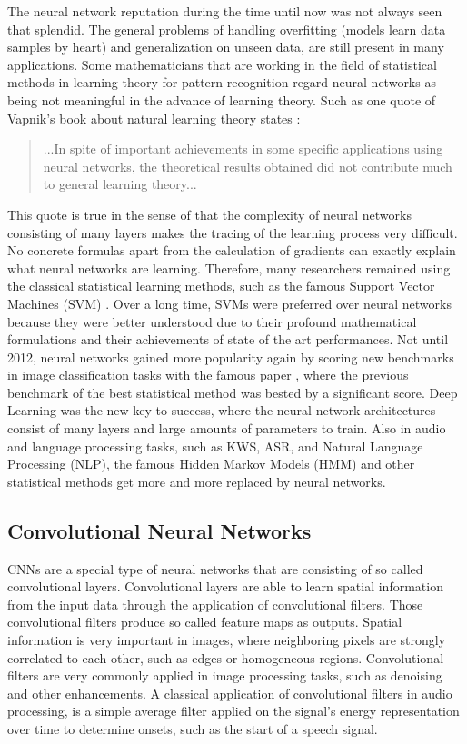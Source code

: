 The neural network reputation during the time until now was not always seen that splendid.
The general problems of handling overfitting (models learn data samples by heart) and generalization on unseen data, are still present in many applications.
Some mathematicians that are working in the field of statistical methods in learning theory for pattern recognition regard neural networks as being not meaningful in the advance of learning theory.
Such as one quote of Vapnik's book about natural learning theory states \cite{Vapnik1995}:
\begin{quote}
...In spite of important achievements in some specific applications using neural networks, the theoretical results obtained did not contribute much to general learning theory...
\end{quote}
This quote is true in the sense of that the complexity of neural networks consisting of many layers makes the tracing of the learning process very difficult.
No concrete formulas apart from the calculation of gradients can exactly explain what neural networks are learning.
Therefore, many researchers remained using the classical statistical learning methods, such as the famous Support Vector Machines (SVM) \cite{Cortes1995}.
Over a long time, SVMs were preferred over neural networks because they were better understood due to their profound mathematical formulations and their achievements of state of the art performances.
Not until 2012, neural networks gained more popularity again by scoring new benchmarks in image classification tasks with the famous paper \cite{Krizhevsky2012}, where the previous benchmark of the best statistical method was bested by a significant score.
Deep Learning was the new key to success, where the neural network architectures consist of many layers and large amounts of parameters to train.
Also in audio and language processing tasks, such as KWS, ASR, and Natural Language Processing (NLP), the famous Hidden Markov Models (HMM) and other statistical methods get more and more replaced by neural networks.



\subsection{Convolutional Neural Networks}\label{sec:prev_nn_cnn}
CNNs are a special type of neural networks that are consisting of so called convolutional layers.
Convolutional layers are able to learn spatial information from the input data through the application of convolutional filters.
Those convolutional filters produce so called feature maps as outputs.
Spatial information is very important in images, where neighboring pixels are strongly correlated to each other, such as edges or homogeneous regions.
Convolutional filters are very commonly applied in image processing tasks, such as denoising and other enhancements.
A classical application of convolutional filters in audio processing, is a simple average filter applied on the signal's energy representation over time to determine onsets, such as the start of a speech signal.


